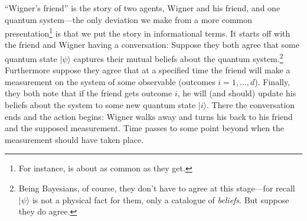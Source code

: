``Wigner's friend'' is the story of two agents, Wigner and his friend, and one quantum system---the only deviation we make from a more common presentation\footnote{For instance, \cite{Albert94} is about as common as they get.} is that we put the story in informational terms.  It starts off with the friend and Wigner having a conversation:  Suppose they both agree that some quantum state $|\psi\rangle$ captures their mutual beliefs about the quantum system.\footnote{Being Bayesians, of course, they don't have to agree at this stage---for recall $|\psi\rangle$ is not a physical fact for them, only a catalogue of {\it beliefs}.  But suppose they do agree.} Furthermore suppose they agree that at a specified time the friend will make a measurement on the system of some observable (outcomes $i=1,\ldots,d$).  Finally, they both note that if the friend gets outcome $i$, he will (and should) update his beliefs about the system to some new quantum state $|i\rangle$.  There the conversation ends and the action begins:  Wigner walks away and turns his back to his friend and the supposed measurement.  Time passes to some point beyond when the measurement should have taken place.

